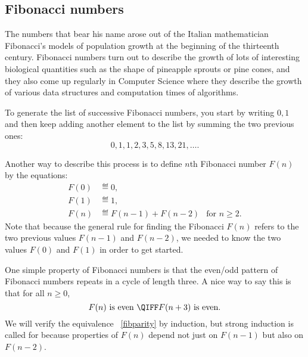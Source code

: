 \subsection{Fibonacci numbers}\label{sec:fib}

The numbers that bear his name arose
out of the Italian mathematician Fibonacci's models of population
growth at the beginning of the thirteenth century.  Fibonacci numbers
turn out to describe the growth of lots of interesting biological
quantities such as the shape of pineapple sprouts or pine cones, and
they also come up regularly in Computer Science where they describe
the growth of various data structures and computation times of
algorithms.

To generate the list of successive Fibonacci numbers, you start by
writing $0,1$ and then keep adding another element to the list by
summing the two previous ones:
\[
0, 1, 1, 2, 3, 5, 8, 13, 21,\dots.
\]

Another way to describe this process is to define $n$th Fibonacci
number $F(n)$ by the equations:
\begin{align*}
F(0) &\eqdef 0,\\
F(1) &\eqdef 1,\\ 
F(n) &\eqdef F(n-1) + F(n-2) &\mbox{for $n \geq 2$.} 
\end{align*}
Note that because the general rule for finding the Fibonacci $F(n)$
refers to the two previous values $F(n-1)$ and $F(n-2)$, we needed to
know the two values $F(0)$ and $F(1)$ in order to get started.

One simple property of Fibonacci numbers is that the even/odd pattern
of Fibonacci numbers repeats in a cycle of length three.  A nice way
to say this is that for all $n \geq 0$,
\begin{equation}\label{fibparity}
F(n)\ \text{is even}\ \QIFF F(n+3)\ \text{is even}.
\end{equation}
We will verify the equivalence ~\eqref{fibparity} by induction, but
strong induction is called for because properties of $F(n)$ depend not
just on $F(n-1)$ but also on $F(n-2)$.

